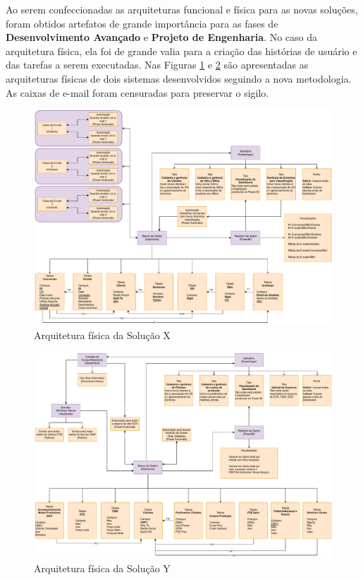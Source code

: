 	Ao serem confeccionadas as arquiteturas funcional e física para as novas soluções, foram obtidos artefatos de grande importância para as
	fases de \textbf{Desenvolvimento Avançado} e \textbf{Projeto de Engenharia}. No caso da arquitetura física, ela foi de grande valia para a criação das
	histórias de usuário e das tarefas a serem executadas. Nas Figuras \ref{fig:metodologia:solucaoXArqFis} e \ref{fig:metodologia:solucaoYArqFis} são apresentadas as arquiteturas físicas de dois sistemas desenvolvidos seguindo
	a nova metodologia. As caixas de e-mail foram censuradas para preservar o sigilo.


	\begin{figure}[!h]
		\centering
		\includegraphics[width=1\textwidth]{./figuras/solucaoXArqFis.pdf}
		\caption{Arquitetura física da Solução X}
		\label{fig:metodologia:solucaoXArqFis}
	\end{figure}
	
	\begin{figure}[!h]
		\centering
		\includegraphics[width=1\textwidth]{./figuras/oneStopArqFis.pdf}
		\caption{Arquitetura física da Solução Y}
		\label{fig:metodologia:solucaoYArqFis}
	\end{figure}

